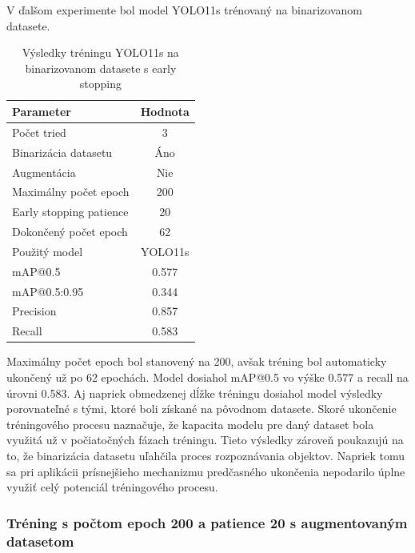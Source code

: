                 V ďalšom experimente bol model YOLO11s trénovaný na binarizovanom datasete.

                \begin{table}[H]
                    \centering
                    \begin{tabular}{|l|c|}
                    \hline
                    \textbf{Parameter} & \textbf{Hodnota} \\ \hline
                    Počet tried & 3 \\ \hline
                    Binarizácia datasetu & Áno \\ \hline
                    Augmentácia & Nie \\ \hline
                    Maximálny počet epoch & 200 \\ \hline
                    Early stopping patience & 20 \\ \hline
                    Dokončený počet epoch & 62 \\ \hline
                    Použitý model & YOLO11s \\ \hline
                    mAP@0.5 & 0.577 \\ \hline
                    mAP@0.5:0.95 & 0.344 \\ \hline
                    Precision & 0.857 \\ \hline
                    Recall & 0.583 \\ \hline
                    \end{tabular}
                    \caption{Výsledky tréningu YOLO11s na binarizovanom datasete s early stopping}
                    \label{tab:yolo11s_binary_earlystop_20p}
                \end{table}

                Maximálny počet epoch bol stanovený na 200, avšak tréning bol automaticky ukončený už po 62 epochách. Model dosiahol mAP@0.5 vo výške 0.577 a recall na úrovni 0.583. Aj napriek obmedzenej dĺžke tréningu dosiahol model výsledky porovnateľné s tými, ktoré boli získané na pôvodnom datasete. Skoré ukončenie tréningového procesu naznačuje, že kapacita modelu pre daný dataset bola využitá už v počiatočných fázach tréningu. Tieto výsledky zároveň poukazujú na to, že binarizácia datasetu uľahčila proces rozpoznávania objektov. Napriek tomu sa pri aplikácii prísnejšieho mechanizmu predčasného ukončenia nepodarilo úplne využiť celý potenciál tréningového procesu.

                \subsubsection{Tréning s počtom epoch 200 a patience 20 s augmentovaným datasetom}

